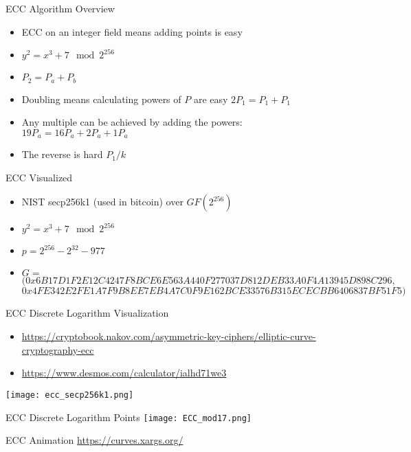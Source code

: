 \begin{withoutheadline}
\begin{frame}{ECC Algorithm Overview}
    \begin{itemize}
        \item ECC on an integer field means adding points is easy
        \item $y^2 = x^3 + 7 \mod 2^{256}$
        \item $P_2 = P_a + P_b$ 
        \item Doubling means calculating powers of $P$ are easy $2P_1 = P_1 + P_1$
        \item Any multiple can be achieved by adding the powers: $19P_a = 16P_a + 2P_a + 1P_a$
        \item The reverse is hard $P_1 / k$
    \end{itemize}
\end{frame}

\begin{frame}{ECC Visualized}
    \begin{itemize}
        \item NIST secp256k1 (used in bitcoin) over $GF(2^{256})$
        \item $y^2 = x^3 + 7 \mod 2^{256}$
        \item $p = 2^{256} - 2^{32} - 977$
        \item $G =$
          $( 0x6B17D1F2E12C4247F8BCE6E563A440F277037D812DEB33A0F4A13945D898C296,$ \\
          $  0x4FE342E2FE1A7F9B8EE7EB4A7C0F9E162BCE33576B315ECECBB6406837BF51F5 )$
    \end{itemize}
\end{frame}

\begin{frame}{ECC Discrete Logarithm Visualization}
    \begin{itemize}
        \item \url{https://cryptobook.nakov.com/asymmetric-key-ciphers/elliptic-curve-cryptography-ecc}
        \item \url{https://www.desmos.com/calculator/ialhd71we3}
    \end{itemize}
    \texttt{[image: ecc\_secp256k1.png]}
\end{frame}

\begin{frame}{ECC Discrete Logarithm Points}
    \texttt{[image: ECC\_mod17.png]}
\end{frame}


\begin{frame}{ECC Animation}
    \url{https://curves.xargs.org/}
\end{frame}
    

\end{withoutheadline}
